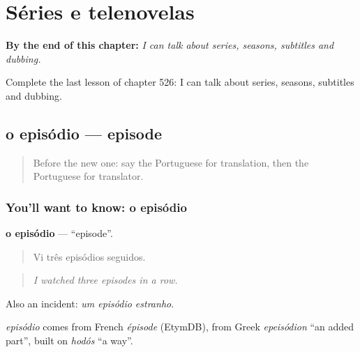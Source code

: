 
\chapter{Séries e telenovelas}
\label{ch:pt-series-e-telenovelas}

\begin{chapteropening}
\textbf{By the end of this chapter:} \emph{I can talk about series, seasons, subtitles and dubbing.}

Complete the last lesson of chapter 526: I can talk about series, seasons, subtitles and dubbing.
\end{chapteropening}

\section[o episódio]{o episódio — episode}

\label{lesson:PT-C526-episodio}



\begin{quote}
Before the new one: say the Portuguese for translation, then the Portuguese for translator.
\end{quote}

\subsection*{You'll want to know: o episódio}
\textbf{o episódio} — \textquotedblleft{}episode\textquotedblright{}.

\begin{quote}
Vi três episódios seguidos.
\end{quote}

\begin{quote}
\emph{I watched three episodes in a row.}
\end{quote}

Also an incident: \emph{um episódio estranho}.

\begin{cousinweb}
\emph{episódio} comes from French \emph{épisode} (EtymDB), from Greek \emph{epeisódion} \textquotedblleft{}an added part\textquotedblright{}, built on \emph{hodós} \textquotedblleft{}a way\textquotedblright{}.
\end{cousinweb}

